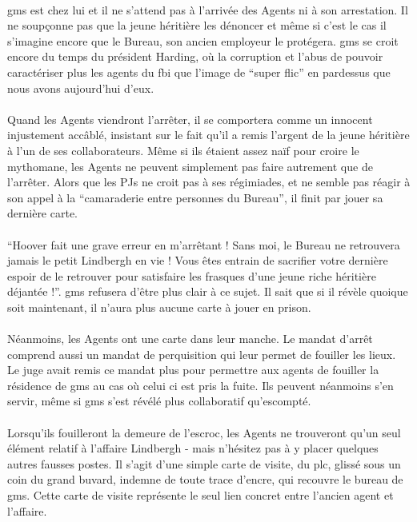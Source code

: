 \paragraph{} \gls{gms} est chez lui et il ne s'attend pas à l'arrivée des Agents ni à son arrestation. Il ne soupçonne pas que la
jeune héritière les dénoncer et même si c'est le cas il s'imagine encore que le Bureau, son ancien employeur le protégera. \gls{gms}
se croit encore du temps du président Harding, où la corruption et l'abus de pouvoir caractériser plus les agents du \gls{fbi} que 
l'image de ``super flic'' en pardessus que nous avons aujourd'hui d'eux. 

\paragraph{} Quand les Agents viendront l'arrêter, il se comportera comme un innocent injustement accâblé, insistant sur le fait 
qu'il a remis l'argent de la jeune héritière à l'un de ses collaborateurs. Même si ils étaient assez naïf pour croire le mythomane,
les Agents ne peuvent simplement pas faire autrement que de l'arrêter. Alors que les PJs ne croit pas à ses régimiades, et ne semble
pas réagir à son appel à la ``camaraderie entre personnes du Bureau'', il finit par jouer sa dernière carte.

\paragraph{} ``Hoover fait une grave erreur en m'arrêtant ! Sans moi, le Bureau ne retrouvera jamais le petit Lindbergh en vie ! Vous 
êtes entrain de sacrifier votre dernière espoir de le retrouver pour satisfaire les frasques d'une jeune riche héritière déjantée !''.
\gls{gms} refusera d'être plus clair à ce sujet. Il sait que si il révèle quoique soit maintenant, il n'aura plus aucune carte à jouer
en prison.

\paragraph{} Néanmoins, les Agents ont une carte dans leur manche. Le mandat d'arrêt comprend aussi un mandat de perquisition qui leur
permet de fouiller les lieux. Le juge avait remis ce mandat plus pour permettre aux agents de fouiller la résidence de \gls{gms} au cas
où celui ci est pris la fuite. Ils peuvent néanmoins s'en servir, même si \gls{gms} s'est révélé plus collaboratif qu'escompté.

\paragraph{} Lorsqu'ils fouilleront la demeure de l'escroc, les Agents ne trouveront qu'un seul élément relatif à l'affaire Lindbergh -
mais n'hésitez pas à y placer quelques autres fausses postes. Il s'agit d'une simple carte de visite, du \gls{plc}, glissé sous un coin
du grand buvard, indemne de toute trace d'encre, qui recouvre le bureau de \gls{gms}. Cette carte de visite représente le seul lien 
concret entre l'ancien agent et l'affaire. 

